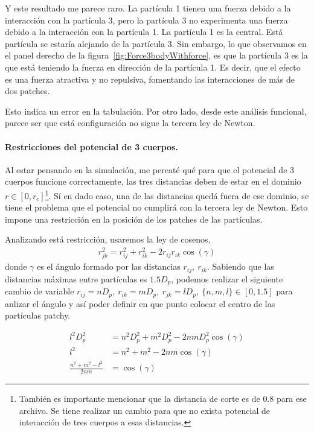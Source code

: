 \documentclass[../main.tex]{subfiles}
\begin{document}
Y este resultado me parece raro.
La partícula 1 tienen una fuerza debido a la interacción con la partícula 3, pero la partícula 3 no experimenta una fuerza debido a la interacción con la partícula 1.
La partícula 1 es la central.
Está partícula se estaría alejando de la partícula 3.
Sin embargo, lo que observamos en el panel derecho de la figura~\ref{fig:Force3bodyWithforce}, es que la partícula 3 es la que está teniendo la fuerza en dirección de la partícula 1.
Es decir, que el efecto es una fuerza atractiva y no repulsiva, fomentando las interacciones de más de dos patches.

Esto indica un error en la tabulación.
Por otro lado, desde este análisis funcional, parece ser que está configuración no sigue la tercera ley de Newton.

\paragraph{Restricciones del potencial de 3 cuerpos.}
Al estar pensando en la simulación, me percaté qué para que el potencial de 3 cuerpos funcione correctamente, las tres distancias deben de estar en el dominio $r\in[0,r_c]$\footnote{También es importante mencionar que la distancia de corte es de $0.8$ para ese archivo. Se tiene realizar un cambio para que no exista potencial de interacción de tres cuerpos a esas distancias.}.
Sí en dado caso, una de las distancias quedá fuera de ese dominio, se tiene el problema que el potencial no cumplirá con la tercera ley de Newton.
Esto impone una restricción en la posición de los patches de las partículas.



Analizando está restricción, usaremos la ley de cosenos,
\begin{gather*}
    r_{jk}^2 = r_{ij}^2 + r_{ik}^2 - 2r_{ij} r_{ik}\cos(\gamma)
\end{gather*}
donde \(\gamma\) es el ángulo formado por las distancias \(r_{ij},~r_{ik}\).
Sabiendo que las distancias máximas entre partículas es \(1.5 D_p\), podemos realizar el siguiente cambio de variable \(r_{ij} = n D_p,~r_{ik} = m D_p,~r_{jk} = l D_p,~\{n,m,l\}\in[0,1.5]\) para anlizar el ángulo y así poder definir en que punto colocar el centro de las partículas patchy.

\begin{align*}
    l^2D_p^2 &= n^2D_p^2 + m^2D_p^2 - 2nmD_p^2\cos(\gamma) \\
    l^2 &= n^2 + m^2 - 2nm\cos(\gamma) \\
    \frac{n^2 + m^2 - l^2}{2nm} &= \cos(\gamma)
\end{align*}
\end{document}
